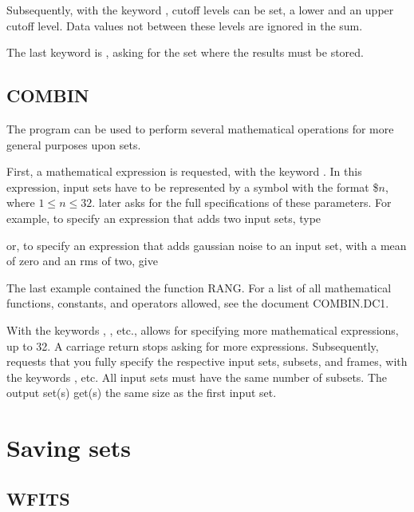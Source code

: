 Subsequently, with the keyword , cutoff levels can be set,
a lower and an upper cutoff level.  Data values not between
these levels are ignored in the sum. 

The last keyword is , asking for the set where the
results must be stored. 

\subsection*{COMBIN}

The program  can be used to perform several mathematical
operations for more general purposes upon sets. 

First, a mathematical expression is requested, with the keyword
.  In this expression, input sets have to be
represented by a symbol with the format \$$n$, where $1 \leq n \leq 32$. 
 later asks for the full specifications of these
parameters.  For example, to specify an expression that adds two input
sets, type


or, to specify an expression that adds gaussian noise to an input set,
with a mean of zero and an rms of two, give

 
The last example contained the function RANG.  For a list of all
mathematical functions, constants, and operators allowed, see the
document COMBIN.DC1. 

With the keywords , , etc.,
 allows for specifying more mathematical expressions, up
to 32.  A carriage return stops  asking for more
expressions.  Subsequently,  requests that you fully specify
the respective input sets, subsets, and frames, with the keywords
, etc.  All input sets must have
the same number of subsets.  The output set(s) get(s) the same size as
the first input set. 

\section{Saving sets}

\subsection*{WFITS}

